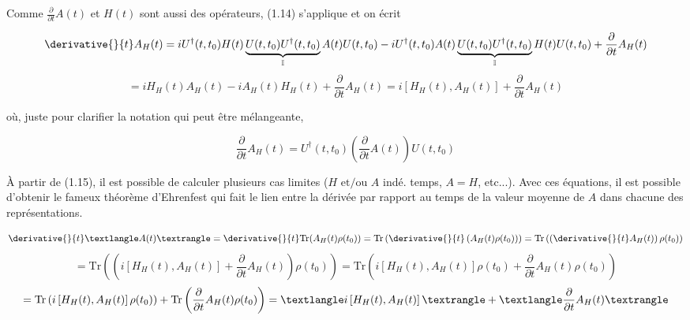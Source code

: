 Comme $\frac{\partial}{\partial t}A(t)$ et $H(t)$ sont aussi des opérateurs, (1.14) s'applique et on écrit

\begin{equation*}
    \derivative{}{t}A_H(t) = iU^\dagger(t,t_0)H(t)\underbrace{U(t,t_0)U^\dagger(t,t_0)}_\text{$\mathbb{I}$}A(t)U(t,t_0) - iU^\dagger(t,t_0)A(t)\underbrace{U(t,t_0)U^\dagger(t,t_0)}_\text{$\mathbb{I}$}H(t)U(t,t_0) + \frac{\partial}{\partial t}A_H(t)
\end{equation*}
\begin{equation}
    = iH_H(t)A_H(t) -iA_H(t)H_H(t) + \frac{\partial}{\partial t}A_H(t) = i\left[H_H(t), A_H(t)\right] + \frac{\partial}{\partial t}A_H(t)
\end{equation}

où, juste pour clarifier la notation qui peut être mélangeante, 

\begin{equation*}
    \frac{\partial}{\partial t}A_H(t) = U^\dagger(t,t_0)\left(\frac{\partial}{\partial t}A(t)\right)U(t,t_0) 
\end{equation*}

À partir de (1.15), il est possible de calculer plusieurs cas limites ($H \text{ et/ou } A$ indé. temps, $A=H$, etc...). Avec ces équations, il est possible d'obtenir le fameux théorème d'Ehrenfest qui fait le lien entre la dérivée par rapport au temps de la valeur moyenne de $A$ dans chacune des représentations.

\begin{equation*}
    \derivative{}{t}\textlangle A(t)\textrangle = \derivative{}{t}\text{Tr}(A_H(t)\rho(t_0)) = \text{Tr}\left(\derivative{}{t}\left(A_H(t)\rho(t_0)\right)\right) = \text{Tr}\left(\left(\derivative{}{t}A_H(t)\right)\rho(t_0)\right) 
\end{equation*}
\begin{equation*}
    = \text{Tr}\left(\left(i\left[H_H(t), A_H(t)\right] + \frac{\partial}{\partial t}A_H(t)\right)\rho(t_0)\right) = \text{Tr}\left(i\left[H_H(t), A_H(t)\right]\rho(t_0) + \frac{\partial}{\partial t}A_H(t)\rho(t_0)\right) 
\end{equation*}
\begin{equation}
    = \text{Tr}\left(i\left[H_H(t), A_H(t)\right]\rho(t_0)\right) + \text{Tr}\left(\frac{\partial}{\partial t}A_H(t)\rho(t_0)\right) = \textlangle i\left[H_H(t), A_H(t)\right]\textrangle + \textlangle \frac{\partial}{\partial t}A_H(t)\textrangle
\end{equation}


